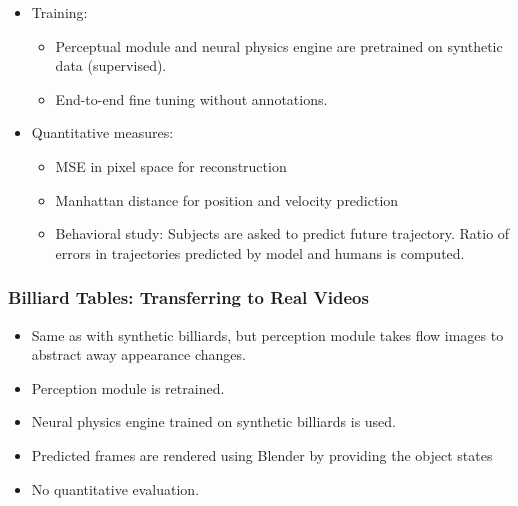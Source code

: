 \documentclass{article}
\begin{document}
\begin{itemize}
\begin{itemize}
        \end{itemize}
        \item Training:
        \begin{itemize}
            \item Perceptual module and neural physics engine are pretrained on synthetic data (supervised).
            \item End-to-end fine tuning without annotations.
        \end{itemize}
        \item Quantitative measures:
        \begin{itemize}
            \item MSE in pixel space for reconstruction
            \item Manhattan distance for position and velocity prediction
            \item Behavioral study: Subjects are asked to predict future trajectory.
            Ratio of errors in trajectories predicted by model and humans is computed.
        \end{itemize}
    \end{itemize}

    \subsubsection{Billiard Tables: Transferring to Real Videos}\label{subsubsec:Learning_to_See_Physics_via_Visual_De_animation:real-billiards}
    \begin{itemize}
        \item Same as with synthetic billiards, but perception module takes flow images to abstract away appearance changes.
        \item Perception module is retrained.
        \item Neural physics engine trained on synthetic billiards is used.
        \item Predicted frames are rendered using Blender by providing the object states
        \item No quantitative evaluation.
    \end{itemize}
\end{document}
